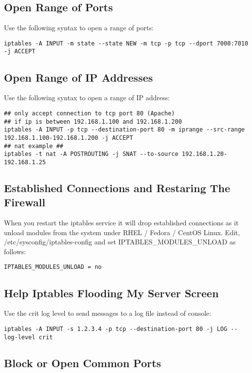 \documentclass[dvipdfm]{book}
\begin{document}
\subsection{Open Range of Ports}

Use the following syntax to open a range of ports:
\begin{verbatim}
iptables -A INPUT -m state --state NEW -m tcp -p tcp --dport 7000:7010 -j ACCEPT
\end{verbatim}

\subsection{Open Range of IP Addresses}

Use the following syntax to open a range of IP address:
\begin{verbatim}
## only accept connection to tcp port 80 (Apache) 
## if ip is between 192.168.1.100 and 192.168.1.200 
iptables -A INPUT -p tcp --destination-port 80 -m iprange --src-range 192.168.1.100-192.168.1.200 -j ACCEPT
## nat example ##
iptables -t nat -A POSTROUTING -j SNAT --to-source 192.168.1.20-192.168.1.25
\end{verbatim}

\subsection{Established Connections and Restaring The Firewall}

When you restart the iptables service it will drop established
connections as it unload modules from the system under RHEL / Fedora /
CentOS Linux. Edit, /etc/sysconfig/iptables-config and set
IPTABLES\_MODULES\_UNLOAD as follows:
\begin{verbatim}
IPTABLES_MODULES_UNLOAD = no
\end{verbatim}

\subsection{Help Iptables Flooding My Server Screen}

Use the crit log level to send messages to a log file instead of console:

\begin{verbatim}
iptables -A INPUT -s 1.2.3.4 -p tcp --destination-port 80 -j LOG --log-level crit
\end{verbatim}

\subsection{Block or Open Common Ports}
\end{document}
